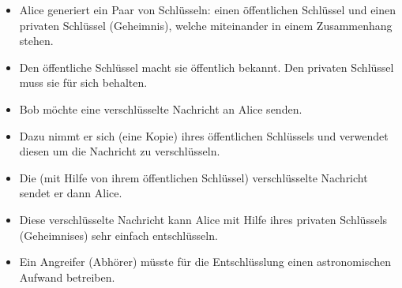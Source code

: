 %
%




\begin{frame}[fragile]
  \begin{itemize}
    \item Alice generiert ein Paar von Schlüsseln: einen öffentlichen Schlüssel und einen privaten Schlüssel (Geheimnis), welche miteinander in einem Zusammenhang stehen.
    \item Den öffentliche Schlüssel macht sie öffentlich bekannt. Den privaten Schlüssel muss sie für sich behalten.
  \end{itemize}
\end{frame}

\begin{frame}[fragile]
  \begin{itemize}
    \item Bob möchte eine verschlüsselte Nachricht an Alice senden.
    \item Dazu nimmt er sich (eine Kopie) ihres öffentlichen Schlüssels und verwendet diesen um die Nachricht zu verschlüsseln.
    \item Die (mit Hilfe von ihrem öffentlichen Schlüssel) verschlüsselte Nachricht sendet er dann Alice.
    \item Diese verschlüsselte Nachricht kann Alice mit Hilfe ihres privaten Schlüssels (Geheimnises) sehr einfach entschlüsseln. 
    \item Ein Angreifer (Abhörer) müsste für die Entschlüsslung einen astronomischen Aufwand betreiben.
  \end{itemize}
  \end{frame}

